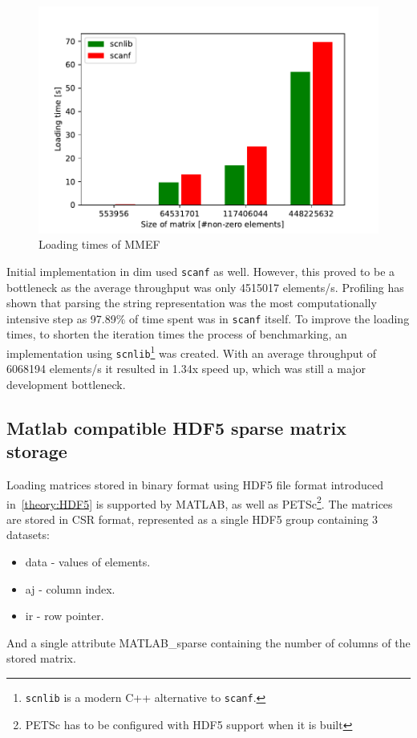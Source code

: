 \documentclass[thesis=M,english]{FITthesis}[2019/12/23]
\begin{document}
\begin{figure}[htp]
    \centering
    \includegraphics[scale=0.6]{static/mmef_loading.pdf}
    \caption{Loading times of MMEF}
\end{figure}

Initial implementation in dim used \texttt{scanf} as well. However, this proved to be a bottleneck as
the average throughput was only \num{4515017} elements/s. Profiling has shown that parsing the string representation
was the most computationally intensive step as 97.89\% of time spent was in \texttt{scanf} itself.
To improve the loading times, to
shorten the iteration times the process of benchmarking, an implementation using
\texttt{scnlib}\footnote{\texttt{scnlib} is a modern C++ alternative to \texttt{scanf}.}
was created. With an average throughput of \num{6068194} elements/s it resulted in 1.34x speed up, which was
still a major development bottleneck.


\subsection{Matlab compatible HDF5 sparse matrix storage}

\newcommand{\hdts}[1]{\textcolor{hdtsc}{#1}}
\newcommand{\hdat}[1]{\textcolor{hdatc}{#1}}

Loading matrices stored in binary format using HDF5 file format introduced in~\ref{theory:HDF5} is supported by MATLAB,
as well as PETSc\footnote{PETSc has to be configured with HDF5 support when it is built}.
The matrices are stored in CSR format, represented as a single HDF5 group containing 3 datasets:
\begin{itemize}
    \item \hdts{data} - values of elements.
    \item \hdts{aj} - column index.
    \item \hdts{ir} - row pointer.
\end{itemize}
And a single attribute \hdat{MATLAB\_sparse} containing the number of columns
of the stored matrix.
\end{document}
